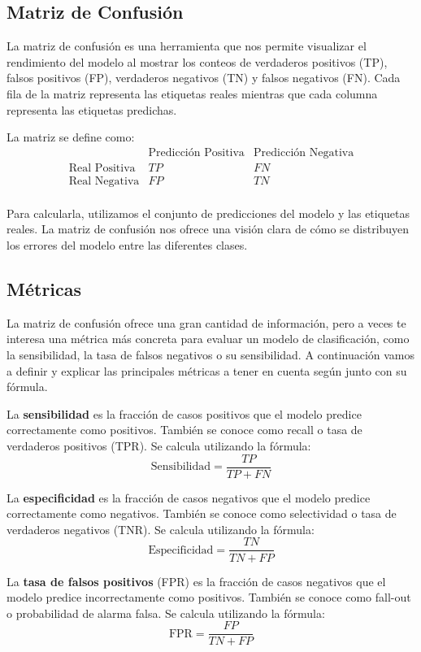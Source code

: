 \subsection{Matriz de Confusión}

La matriz de confusión es una herramienta que nos permite visualizar el rendimiento del modelo al mostrar los conteos de verdaderos positivos (TP), falsos positivos (FP), verdaderos negativos (TN) y falsos negativos (FN). Cada fila de la matriz representa las etiquetas reales mientras que cada columna representa las etiquetas predichas.

La matriz se define como:
\[
\begin{array}{c|cc}
 & \text{Predicción Positiva} & \text{Predicción Negativa} \\
\hline
\text{Real Positiva} & TP & FN \\
\text{Real Negativa} & FP & TN \\
\end{array}
\]

Para calcularla, utilizamos el conjunto de predicciones del modelo y las etiquetas reales. La matriz de confusión nos ofrece una visión clara de cómo se distribuyen los errores del modelo entre las diferentes clases.

\subsection{Métricas}

La matriz de confusión ofrece una gran cantidad de información, pero a veces te interesa una métrica más concreta para evaluar un modelo de clasificación, como la sensibilidad, la tasa de falsos negativos o su sensibilidad. A continuación vamos a definir y explicar las principales métricas a tener en cuenta según \citep{erickson2021magician} junto con su fórmula. 

La \textbf{sensibilidad} es la fracción de casos positivos que el modelo predice correctamente como positivos. También se conoce como recall o tasa de verdaderos positivos (TPR). Se calcula utilizando la fórmula:
\[
\text{Sensibilidad} = \frac{TP}{TP + FN}
\]

La \textbf{especificidad} es la fracción de casos negativos que el modelo predice correctamente como negativos. También se conoce como selectividad o tasa de verdaderos negativos (TNR). Se calcula utilizando la fórmula:
\[
\text{Especificidad} = \frac{TN}{TN + FP}
\]

La \textbf{tasa de falsos positivos} (FPR) es la fracción de casos negativos que el modelo predice incorrectamente como positivos. También se conoce como fall-out o probabilidad de alarma falsa. Se calcula utilizando la fórmula:
\[
\text{FPR} = \frac{FP}{TN + FP}
\]

